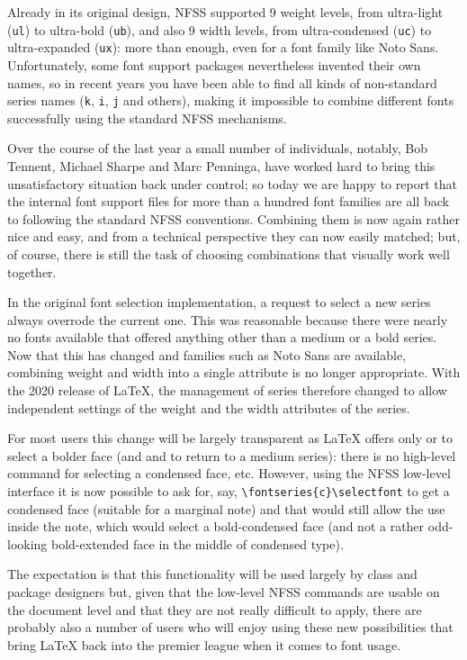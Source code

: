 \documentclass{ltnews}
\begin{document}
Already in its original design, NFSS supported 9 weight levels, from
ultra-light (\texttt{ul}) to ultra-bold (\texttt{ub}), and also 9 width
levels, from ultra-condensed (\texttt{uc}) to ultra-expanded
(\texttt{ux}):  more than enough, even for a font family like Noto
Sans. Unfortunately, some font support packages nevertheless invented
their own names, so in recent years you have been able to find all kinds of
non-standard series names (\texttt{k}, \texttt{i}, \texttt{j} and
others), making it impossible to combine different fonts successfully
using the standard NFSS mechanisms.

Over the course of the last year a small number of individuals,
notably, Bob Tennent, Michael Sharpe and Marc Penninga, have worked hard to
bring this unsatisfactory situation back under control; so today we are
happy to report that the internal font support files for more than a
hundred font families are all back to following the standard NFSS conventions.
Combining them is now again rather nice and easy, and from a technical 
perspective they can now easily matched; but, of course,
there is still the task of choosing combinations that visually work
well together.

In the original font selection implementation, a request to select a new series
always overrode the current one. This was reasonable because there
were nearly no fonts available that offered anything other than a
medium or a bold series. Now that this has changed and families such
as Noto Sans are available, combining weight and width into a single
attribute is no longer appropriate. With the 2020 release of \LaTeX{},
the management of series therefore changed to allow independent
settings of the weight and the width attributes of the series.

For most users this change will be largely transparent as \LaTeX{}
offers only  or  to select a bolder face (and
 and  to return to a medium series): there is no
high-level command for selecting a condensed face, etc. However, using
the NFSS low-level interface it is now possible to ask for, say,
\verb=\fontseries{c}\selectfont= to get a condensed
face (suitable for a marginal note) and that would still allow  
the use  inside the note, which would
select a bold-condensed face (and not a rather odd-looking
bold-extended face in the middle of condensed type).

The expectation is that this functionality will be used largely by
class and package designers but, given that the low-level NFSS
commands are usable on the document level and that they are not really
difficult to apply, there are probably also a number of users who will
enjoy using these new possibilities that bring \LaTeX{} back into the
premier league when it comes to font usage.
\end{document}
